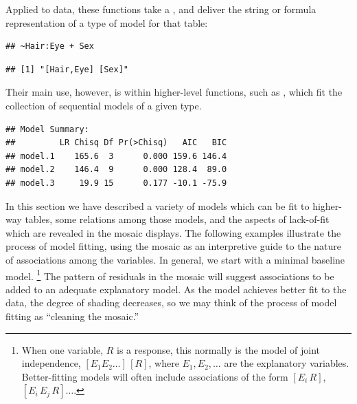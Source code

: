 \documentclass[11pt]{book}
\renewenvironment{knitrout}{\small\renewcommand{\baselinestretch}{.85}}{} %
\begin{document}
Applied to data, these functions take a , and deliver
the string or formula representation of a type of model for that table:
\begin{knitrout}
\color{fgcolor}\begin{kframe}
\begin{alltt}
\hlstd{(}\hlstd{(}\hlstd{,} 
\end{alltt}
\begin{verbatim}
## ~Hair:Eye + Sex
\end{verbatim}
\begin{alltt}
\hlstd{(}\hlstd{(}\hlstd{,} 
\end{alltt}
\begin{verbatim}
## [1] "[Hair,Eye] [Sex]"
\end{verbatim}
\end{kframe}
\end{knitrout}
Their main use, however, is within higher-level functions,
such as , which fit the collection of sequential models
of a given type.
\begin{knitrout}
\color{fgcolor}\begin{kframe}
\begin{alltt}
 \hlkwb{<-}  \hlstd{=}\hlstd{)}
\end{alltt}
\begin{verbatim}
## Model Summary:
##         LR Chisq Df Pr(>Chisq)   AIC   BIC
## model.1    165.6  3      0.000 159.6 146.4
## model.2    146.4  9      0.000 128.4  89.0
## model.3     19.9 15      0.177 -10.1 -75.9
\end{verbatim}
\end{kframe}
\end{knitrout}

In this section we have described a variety of models which can be fit
to higher-way tables, some relations among those models, and the aspects
of lack-of-fit which are revealed in the mosaic displays.
The following examples illustrate the process of model fitting,
using the mosaic as an interpretive guide to the nature of associations
among the variables.
In general, we start with a minimal baseline model.%
%
\footnote{When one variable, $R$
is a response, this normally is the model of joint independence,
\([E_1 E_2 \dots] \, [R]\), where \(E_1, E_2, \dots\) are the explanatory
variables.  Better-fitting models will often include associations
of the form \([E_i \, R]\), \([E_i \, E_j \, R] \dots \).
}
The pattern of residuals in the mosaic will suggest associations to be added
to an adequate explanatory model.
As the model achieves better fit to the data, the degree of shading
decreases, so we may think of the process of model fitting as
``cleaning the mosaic.''
\end{document}
